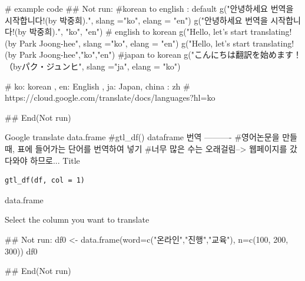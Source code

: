 \documentclass[a4paper]{book}
\begin{document}
%
\begin{Examples}
\begin{ExampleCode}
# example code
## Not run: 
#korean to english : default
g("안녕하세요 번역을 시작합니다!(by 박중희).", slang ="ko", elang = "en")
g("안녕하세요 번역을 시작합니다!(by 박중희).", "ko", "en")
# english to korean
g("Hello, let’s start translating! (by Park Joong-hee", slang ="ko", elang = "en")
g("Hello, let’s start translating! (by Park Joong-hee","ko","en")
#japan to korean
g("こんにちは翻訳を始めます！（byパク・ジュンヒ", slang ="ja", elang = "ko")

# ko: korean , en: English , ja: Japan, china : zh
# https://cloud.google.com/translate/docs/languages?hl=ko

## End(Not run)
\end{ExampleCode}
\end{Examples}
%
\begin{Description}
Google translate data.frame
\#gtl\_df() dataframe 번역 ----------
\#영어논문을 만들 때, 표에 들어가는 단어를 번역하여 넣기
\#너무 많은 수는 오래걸림--> 웹페이지를 갔다와야 하므로...
Title
\end{Description}
%
\begin{Usage}
\begin{verbatim}
gtl_df(df, col = 1)
\end{verbatim}
\end{Usage}
%
\begin{Arguments}
\begin{ldescription}
\item[\code{df}] data.frame

\item[\code{col}] Select the column you want to translate
\end{ldescription}
\end{Arguments}
%
\begin{Examples}
\begin{ExampleCode}
## Not run: 
 df0 <-  data.frame(word=c("온라인","진행","교육"),
                   n=c(100, 200, 300))
 df0 %

## End(Not run)


\end{ExampleCode}
\end{Examples}
\end{document}
